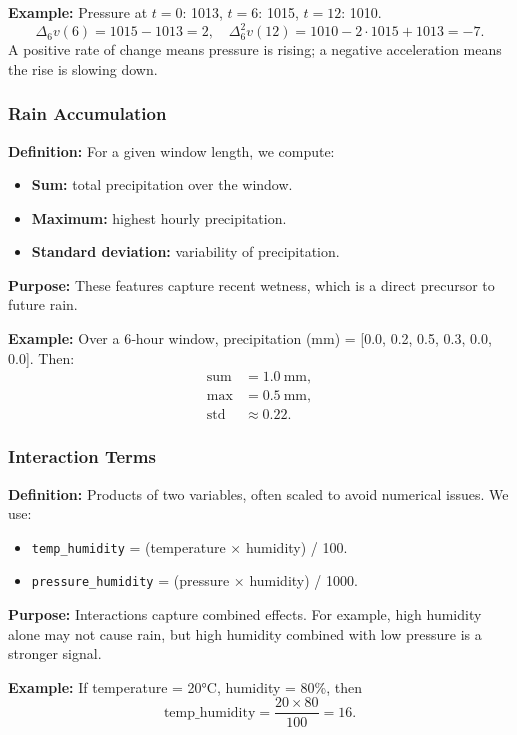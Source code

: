 \documentclass[12pt]{article}
\begin{document}
	\textbf{Example:} Pressure at $t=0$: 1013, $t=6$: 1015, $t=12$: 1010.
	\[
	\Delta_6 v(6) = 1015-1013 = 2,\quad
	\Delta_6^2 v(12) = 1010 - 2\cdot1015 + 1013 = -7.
	\]
	A positive rate of change means pressure is rising; a negative acceleration means the rise is slowing down.
	
	\subsubsection{Rain Accumulation}
	\textbf{Definition:} For a given window length, we compute:
	\begin{itemize}
		\item \textbf{Sum:} total precipitation over the window.
		\item \textbf{Maximum:} highest hourly precipitation.
		\item \textbf{Standard deviation:} variability of precipitation.
	\end{itemize}
	\textbf{Purpose:} These features capture recent wetness, which is a direct precursor to future rain.
	
	\textbf{Example:} Over a 6‑hour window, precipitation (mm) = [0.0, 0.2, 0.5, 0.3, 0.0, 0.0]. Then:
	\begin{align*}
		\text{sum} &= 1.0\ \text{mm},\\
		\text{max} &= 0.5\ \text{mm},\\
		\text{std} &\approx 0.22.
	\end{align*}
	
	\subsubsection{Interaction Terms}
	\textbf{Definition:} Products of two variables, often scaled to avoid numerical issues. We use:
	\begin{itemize}
		\item \texttt{temp\_humidity} = (temperature × humidity) / 100.
		\item \texttt{pressure\_humidity} = (pressure × humidity) / 1000.
	\end{itemize}
	\textbf{Purpose:} Interactions capture combined effects. For example, high humidity alone may not cause rain, but high humidity combined with low pressure is a stronger signal.
	
	\textbf{Example:} If temperature = 20°C, humidity = 80\%, then
	\[
	\text{temp\_humidity} = \frac{20\times80}{100} = 16.
	\]
	
\end{document}

